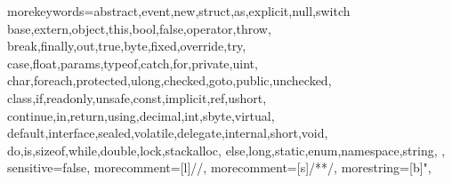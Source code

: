   {morekeywords={abstract,event,new,struct,as,explicit,null,switch
    base,extern,object,this,bool,false,operator,throw,
    break,finally,out,true,byte,fixed,override,try,
    case,float,params,typeof,catch,for,private,uint,
    char,foreach,protected,ulong,checked,goto,public,unchecked,
    class,if,readonly,unsafe,const,implicit,ref,ushort,
    continue,in,return,using,decimal,int,sbyte,virtual,
    default,interface,sealed,volatile,delegate,internal,short,void,
    do,is,sizeof,while,double,lock,stackalloc,
    else,long,static,enum,namespace,string, },
    sensitive=false,
    morecomment=[l]{//},
    morecomment=[s]{/*}{*/},
    morestring=[b]",
}
